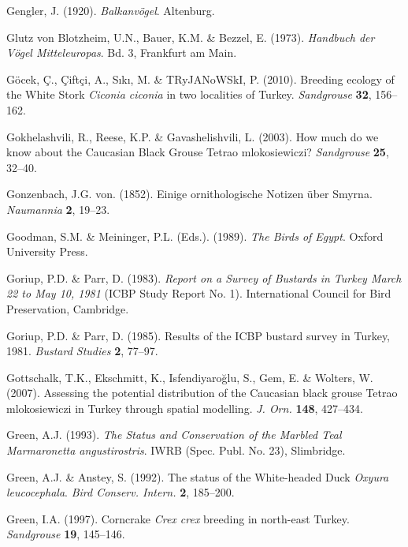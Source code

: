\documentclass[
  a4paper,
  DIV=11,
  numbers=noendperiod]{scrreprt}
\newlength{\cslhangindent}
\newenvironment{CSLReferences}[2] %
 {\begin{list}{}{%
  \setlength{\itemindent}{0pt}
  \setlength{\leftmargin}{0pt}
  \setlength{\parsep}{0pt}
  \ifodd #1
   \setlength{\leftmargin}{\cslhangindent}
   \setlength{\itemindent}{-1\cslhangindent}
  \fi
  \setlength{\itemsep}{#2\baselineskip}}}
 {\end{list}}
\begin{document}
\begin{CSLReferences}{1}{1}
Gengler, J. (1920). \emph{{Balkanvögel}}. Altenburg.

Glutz von Blotzheim, U.N., Bauer, K.M. \& Bezzel, E. (1973).
\emph{{Handbuch der Vögel Mitteleuropas}}. Bd. 3, Frankfurt am Main.

Göcek, Ç., Çiftçi, A., Sıkı, M. \& TRyJANoWSkI, P. (2010). {Breeding
ecology of the White Stork \emph{Ciconia ciconia} in two localities of
Turkey}. \emph{Sandgrouse} \textbf{32}, 156--162.

Gokhelashvili, R., Reese, K.P. \& Gavashelishvili, L. (2003). {How much
do we know about the Caucasian Black Grouse Tetrao mlokosiewiczi?}
\emph{Sandgrouse} \textbf{25}, 32--40.

Gonzenbach, J.G. von. (1852). {Einige ornithologische Notizen über
Smyrna}. \emph{Naumannia} \textbf{2}, 19--23.

Goodman, S.M. \& Meininger, P.L. (Eds.). (1989). \emph{{The Birds of
Egypt}}. Oxford University Press.

Goriup, P.D. \& Parr, D. (1983). \emph{{Report on a Survey of Bustards
in Turkey March 22 to May 10, 1981}} (ICBP Study Report No. 1).
International Council for Bird Preservation, Cambridge.

Goriup, P.D. \& Parr, D. (1985). {Results of the ICBP bustard survey in
Turkey, 1981}. \emph{Bustard Studies} \textbf{2}, 77--97.

Gottschalk, T.K., Ekschmitt, K., Isfendiyaroğlu, S., Gem, E. \& Wolters,
W. (2007). {Assessing the potential distribution of the Caucasian black
grouse Tetrao mlokosiewiczi in Turkey through spatial modelling}.
\emph{J. Orn.} \textbf{148}, 427--434.

Green, A.J. (1993). \emph{{The Status and Conservation of the Marbled
Teal Marmaronetta angustirostris}}. IWRB (Spec. Publ. No. 23),
Slimbridge.

Green, A.J. \& Anstey, S. (1992). {The status of the White-headed Duck
\emph{Oxyura leucocephala}}. \emph{Bird Conserv. Intern.} \textbf{2},
185--200.

Green, I.A. (1997). {Corncrake \emph{Crex crex} breeding in north-east
Turkey}. \emph{Sandgrouse} \textbf{19}, 145--146.


\end{CSLReferences}
\end{document}

